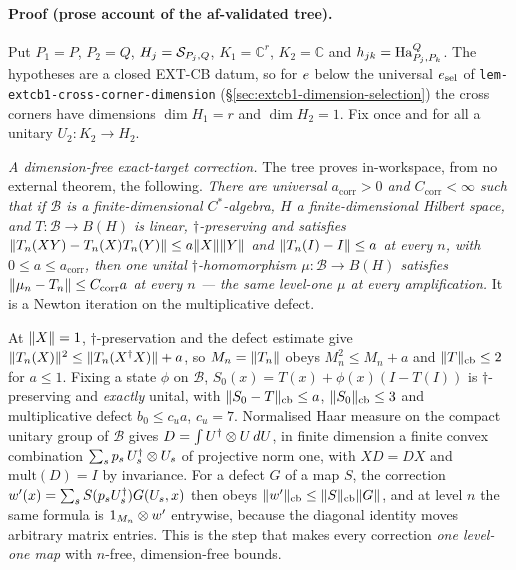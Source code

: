 \paragraph{Proof (prose account of the af-validated tree).}
Put $P_1=P$, $P_2=Q$, $H_j=\mathcal S_{P_j,Q}$, $K_1=\mathbb C^{r}$, $K_2=\mathbb C$ and
$h_{jk}=\mathrm{Ha}^{Q}_{P_j,P_k}$. The hypotheses are a closed EXT-CB datum, so for $e$ below
the universal $e_{\mathrm{sel}}$ of \texttt{lem-extcb1-cross-corner-dimension}
(\S\ref{sec:extcb1-dimension-selection}) the cross corners have dimensions $\dim H_1=r$ and
$\dim H_2=1$. Fix once and for all a unitary $U_2:K_2\to H_2$.

\emph{A dimension-free exact-target correction.} The tree proves in-workspace, from no
external theorem, the following. \emph{There are universal $a_{\mathrm{corr}}>0$ and
$C_{\mathrm{corr}}<\infty$ such that if $\mathcal B$ is a finite-dimensional $C^*$-algebra,
$H$ a finite-dimensional Hilbert space, and $T:\mathcal B\to B(H)$ is linear,
$\dagger$-preserving and satisfies $\lVert T_n(XY)-T_n(X)T_n(Y)\rVert\le a\lVert X\rVert\lVert Y\rVert$ and
$\lVert T_n(I)-I\rVert\le a$ at every $n$, with $0\le a\le a_{\mathrm{corr}}$, then one unital
$\dagger$-homomorphism $\mu:\mathcal B\to B(H)$ satisfies
$\lVert \mu_n-T_n\rVert\le C_{\mathrm{corr}}a$ at every $n$ --- the same level-one $\mu$ at every
amplification.} It is a Newton iteration on the multiplicative defect.

At $\lVert X\rVert=1$, $\dagger$-preservation and the defect estimate give
$\lVert T_n(X)\rVert^{2}\le\lVert T_n(X^{\dagger} X)\rVert+a$, so $M_n=\lVert T_n\rVert$ obeys $M_n^{2}\le M_n+a$ and
$\lVert T\rVert_{\mathrm{cb}}\le2$ for $a\le1$. Fixing a state $\phi$ on $\mathcal B$,
$S_0(x)=T(x)+\phi(x)(I-T(I))$ is $\dagger$-preserving and \emph{exactly} unital, with
$\lVert S_0-T\rVert_{\mathrm{cb}}\le a$, $\lVert S_0\rVert_{\mathrm{cb}}\le3$ and multiplicative defect
$b_0\le c_ua$, $c_u=7$. Normalised Haar measure on the compact unitary group of
$\mathcal B$ gives $D=\int U^{\dagger}\otimes U\,dU$, in finite dimension a finite convex
combination $\sum_sp_s\,U_s^{\dagger}\otimes U_s$ of projective norm one, with $XD=DX$ and
$\mathrm{mult}(D)=I$ by invariance. For a defect $G$ of a map $S$, the correction
$w'(x)=\sum_sS(p_sU_s^{\dagger})G(U_s,x)$ then obeys
$\lVert w'\rVert_{\mathrm{cb}}\le\lVert S\rVert_{\mathrm{cb}}\lVert G\rVert$, and at level $n$ the same formula
is $1_{M_{n}}\otimes w'$ entrywise, because the diagonal identity moves arbitrary matrix entries.
This is the step that makes every correction \emph{one level-one map} with $n$-free,
dimension-free bounds.

